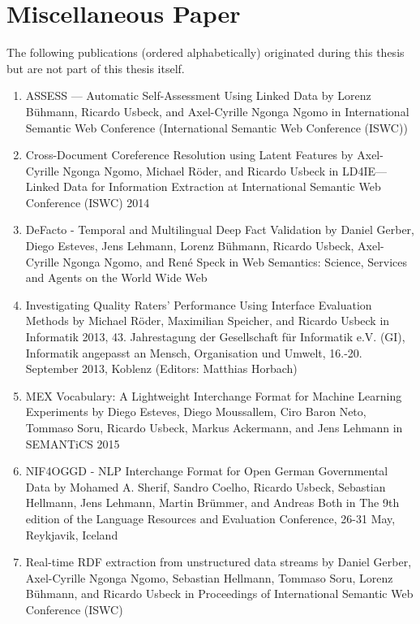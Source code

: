\section*{Miscellaneous Paper}
The following publications (ordered alphabetically) originated during this thesis but are not part of this thesis itself. 
\begin{enumerate}
    \item ASSESS --- Automatic Self-Assessment Using Linked Data by Lorenz Bühmann, Ricardo Usbeck, and Axel-Cyrille Ngonga Ngomo in International Semantic Web Conference (International Semantic Web Conference (ISWC)) 
    \item Cross-Document Coreference Resolution using Latent Features by Axel-Cyrille Ngonga Ngomo, Michael Röder, and Ricardo Usbeck in LD4IE---Linked Data for Information Extraction at International Semantic Web Conference (ISWC) 2014 
    \item DeFacto - Temporal and Multilingual Deep Fact Validation by Daniel Gerber, Diego Esteves, Jens Lehmann, Lorenz Bühmann, Ricardo Usbeck, Axel-Cyrille Ngonga Ngomo, and René Speck in Web Semantics: Science, Services and Agents on the World Wide Web
    \item Investigating Quality Raters' Performance Using Interface Evaluation Methods by Michael Röder, Maximilian Speicher, and Ricardo Usbeck in Informatik 2013, 43. Jahrestagung der Gesellschaft für Informatik e.V. (GI), Informatik angepasst an Mensch, Organisation und Umwelt, 16.-20. September 2013, Koblenz (Editors: Matthias Horbach) 
    \item MEX Vocabulary: A Lightweight Interchange Format for Machine Learning Experiments by Diego Esteves, Diego Moussallem, Ciro Baron Neto, Tommaso Soru, Ricardo Usbeck, Markus Ackermann, and Jens Lehmann in SEMANTiCS 2015  
    \item NIF4OGGD - NLP Interchange Format for Open German Governmental Data by Mohamed A. Sherif, Sandro Coelho, Ricardo Usbeck, Sebastian Hellmann, Jens Lehmann, Martin Brümmer, and Andreas Both in The 9th edition of the Language Resources and Evaluation Conference, 26-31 May, Reykjavik, Iceland  
    \item Real-time RDF extraction from unstructured data streams by Daniel Gerber, Axel-Cyrille Ngonga Ngomo, Sebastian Hellmann, Tommaso Soru, Lorenz Bühmann, and Ricardo Usbeck in Proceedings of International Semantic Web Conference (ISWC) 
\end{enumerate}